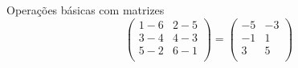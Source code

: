 \begin{frame}[t]{Operações básicas com matrizes}
\begin{equation}
\begin{pmatrix}
            1 - 6  & 2 - 5  \\
            3 - 4  & 4 - 3  \\
            5 - 2  & 6 - 1  \\
        \end{pmatrix}
        =
        \begin{pmatrix}
           -5  & -3 \\
           -1  &  1 \\
            3  &  5 \\
        \end{pmatrix}
    \end{equation}
\end{frame}

